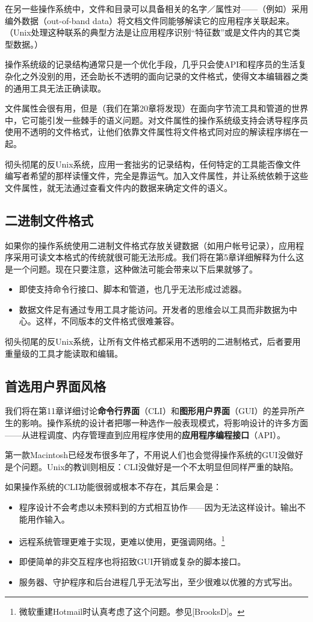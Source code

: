 \documentclass[12pt,oneside]{book}
\begin{document}
\begin{common-format}
在另一些操作系统中，文件和目录可以具备相关的名字／属性对——（例如）采用编外数据（out-of-band data）将文档文件同能够解读它的应用程序关联起来。（Unix处理这种联系的典型方法是让应用程序识别“特征数”或是文件内的其它类型数据。）

操作系统级的记录结构通常只是一个优化手段，几乎只会使API和程序员的生活复杂化之外没别的用，还会助长不透明的面向记录的文件格式，使得文本编辑器之类的通用工具无法正确读取。

文件属性会很有用，但是（我们在第20章将发现）在面向字节流工具和管道的世界中，它可能引发一些棘手的语义问题。对文件属性的操作系统级支持会诱导程序员使用不透明的文件格式，让他们依靠文件属性将文件格式同对应的解读程序绑在一起。

彻头彻尾的反Unix系统，应用一套拙劣的记录结构，任何特定的工具能否像文件编写者希望的那样读懂文件，完全是靠运气。加入文件属性，并让系统依赖于这些文件属性，就无法通过查看文件内的数据来确定文件的语义。

\subsection{二进制文件格式}
如果你的操作系统使用二进制文件格式存放关键数据（如用户帐号记录），应用程序采用可读文本格式的传统就很可能无法形成。我们将在第5章详细解释为什么这是一个问题。现在只要注意，这种做法可能会带来以下后果就够了。

\begin{itemize}
\item 即使支持命令行接口、脚本和管道，也几乎无法形成过滤器。
\item 数据文件足有通过专用工具才能访问。开发者的思维会以工具而非数据为中心。这样，不同版本的文件格式很难兼容。
\end{itemize}

彻头彻尾的反Unix系统，让所有文件格式都采用不透明的二进制格式，后者要用重量级的工具才能读取和编辑。

\subsection{首选用户界面风格}
我们将在第11章详细讨论\textbf{命令行界面}（CLI）和\textbf{图形用户界面}（GUI）的差异所产生的影响。操作系统的设计者把哪一种选作一般表现模式，将影响设计的许多方面——从进程调度、内存管理直到应用程序使用的\textbf{应用程序编程接口}（API）。

第一款Macintosh已经发布很多年了，不用说人们也会觉得操作系统的GUI没做好是个问题。Unix的教训则相反：CLI没做好是一个不太明显但同样严重的缺陷。

如果操作系统的CLI功能很弱或根本不存在，其后果会是：
\begin{itemize}
\item 程序设计不会考虑以未预料到的方式相互协作——因为无法这样设计。输出不能用作输入。
\item 远程系统管理更难于实现，更难以使用，更强调网络。\footnote{微软重建Hotmail时认真考虑了这个问题。参见[BrooksD]。}
\item 即便简单的非交互程序也将招致GUI开销或复杂的脚本接口。
\item 服务器、守护程序和后台进程几乎无法写出，至少很难以优雅的方式写出。
\end{itemize}


\end{common-format}
\end{document}
